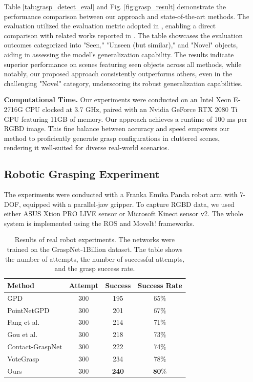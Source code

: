 Table \ref{tab:grasp_detect_eval} and Fig. \ref{fig:grasp_result} demonstrate the performance comparison between our approach and state-of-the-art methods. The evaluation utilized the evaluation metric adopted in \cite{fang2020graspnet}, enabling a direct comparison with related works reported in \cite{fang2020graspnet, gou2021rgb}. The table showcases the evaluation outcomes categorized into "Seen," "Unseen (but similar)," and "Novel" objects, aiding in assessing the model's generalization capability. The results indicate superior performance on scenes featuring seen objects across all methods, while notably, our proposed approach consistently outperforms others, even in the challenging "Novel" category, underscoring its robust generalization capabilities.

\textbf{Computational Time.} Our experiments were conducted on an Intel Xeon E-2716G CPU clocked at 3.7 GHz, paired with an Nvidia GeForce RTX 2080 Ti GPU featuring 11GB of memory. Our approach achieves a runtime of 100 ms per RGBD image. This fine balance between accuracy and speed empowers our method to proficiently generate grasp configurations in cluttered scenes, rendering it well-suited for diverse real-world scenarios.

\subsection{Robotic Grasping Experiment}
\label{sec:real_grasping}

The experiments were conducted with a Franka Emika Panda robot arm with 7-DOF, equipped with a parallel-jaw gripper. To capture RGBD data, we used either ASUS Xtion PRO LIVE sensor or  Microsoft Kinect sensor v2. The whole system is implemented using the ROS and MoveIt! frameworks. \\

\begin{table}[h!]
\caption{Results of real robot experiments. The networks were trained on the GraspNet-1Billion dataset. The table shows the number of attempts, the number of successful attempts, and the grasp success rate.}
\label{tab:real_grasping}
\begin{center}
\begin{tabular}{|l|c|c|c|}
\hline
Method & Attempt & Success & Success Rate \\
\hline
GPD \cite{ten2017grasp} & 300 & 195 & 65\% \\
PointNetGPD \cite{liang2019pointnetgpd} & 300 & 201 & 67\% \\
Fang et al. \cite{fang2020graspnet} & 300 & 214 & 71\% \\
Gou et al. \cite{gou2021rgb} & 300 & 218 & 73\% \\
Contact-GraspNet \cite{sundermeyer2021contact}  & 300 & 222 & 74\% \\
VoteGrasp \cite{hoang2022context} & 300 & 234 & 78\% \\
Ours & 300 & \textbf{240} & \textbf{80}\% \\
\hline
\end{tabular}
\end{center}
\end{table}

